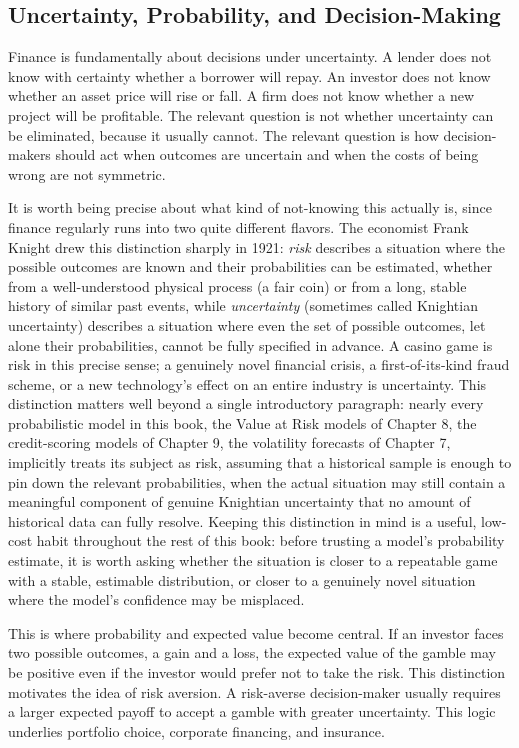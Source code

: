 \documentclass[../ai_in_finance]{subfiles}
\begin{document}
\subsection{Uncertainty, Probability, and Decision-Making}

Finance is fundamentally about decisions under uncertainty. A lender does not know with certainty whether a borrower will repay. An investor does not know whether an asset price will rise or fall. A firm does not know whether a new project will be profitable. The relevant question is not whether uncertainty can be eliminated, because it usually cannot. The relevant question is how decision-makers should act when outcomes are uncertain and when the costs of being wrong are not symmetric.

It is worth being precise about what kind of not-knowing this actually is, since finance regularly runs into two quite different flavors. The economist Frank Knight drew this distinction sharply in 1921: \emph{risk} describes a situation where the possible outcomes are known and their probabilities can be estimated, whether from a well-understood physical process (a fair coin) or from a long, stable history of similar past events, while \emph{uncertainty} (sometimes called Knightian uncertainty) describes a situation where even the set of possible outcomes, let alone their probabilities, cannot be fully specified in advance. A casino game is risk in this precise sense; a genuinely novel financial crisis, a first-of-its-kind fraud scheme, or a new technology's effect on an entire industry is uncertainty.
This distinction matters well beyond a single introductory paragraph: nearly every probabilistic model in this book, the Value at Risk models of Chapter 8, the credit-scoring models of Chapter 9, the volatility forecasts of Chapter 7, implicitly treats its subject as risk, assuming that a historical sample is enough to pin down the relevant probabilities, when the actual situation may still contain a meaningful component of genuine Knightian uncertainty that no amount of historical data can fully resolve. Keeping this distinction in mind is a useful, low-cost habit throughout the rest of this book: before trusting a model's probability estimate, it is worth asking whether the situation is closer to a repeatable game with a stable, estimable distribution, or closer to a genuinely novel situation where the model's confidence may be misplaced.

This is where probability and expected value become central. If an investor faces two possible outcomes, a gain and a loss, the expected value of the gamble may be positive even if the investor would prefer not to take the risk. This distinction motivates the idea of risk aversion. A risk-averse decision-maker usually requires a larger expected payoff to accept a gamble with greater uncertainty. This logic underlies portfolio choice, corporate financing, and insurance.
\end{document}
